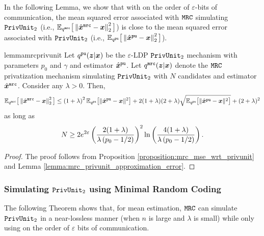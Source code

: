 In the following Lemma, we show that with on the order of $\varepsilon$-bits of communication, the mean squared error associated with $\texttt{MRC}$ simulating $\texttt{PrivUnit}_2$ (i.e., $\mathbb{E}_{q^{\texttt{mrc}}} \big[ \left\lVert  \hat{{\boldsymbol{x}}}^\texttt{mrc} - {\boldsymbol{x}} \right\rVert^2_2  \big]$) is close to the mean squared error associated with $\texttt{PrivUnit}_2$ (i.e., $\mathbb{E}_{q^{\texttt{pu}}} \big[ \left\lVert  \hat{{\boldsymbol{x}}}^\texttt{pu} - {\boldsymbol{x}} \right\rVert^2_2  \big]$).

\begin{restatable}{lemma}{mrcprivunit}\label{theorem:mrc_privunit}
Let $q^{\texttt{pu}}({\boldsymbol{z}} | {\boldsymbol{x}})$ be the  $\varepsilon$-LDP \emph{$\texttt{PrivUnit}_2$} mechanism with parameters $p_0$ and $\gamma$ and estimator $\hat{{\boldsymbol{x}}}^{\texttt{pu}}$. Let $q^{\texttt{mrc}}({\boldsymbol{z}}|{\boldsymbol{x}})$ denote the \emph{$\texttt{MRC}$} privatization mechanism simulating \emph{$\texttt{PrivUnit}_2$} with $N$ candidates and estimator $\hat{{\boldsymbol{x}}}^{\texttt{mrc}}$. 
Consider any $\lambda > 0$. Then,
\begin{align}
   \mathbb{E}_{q^{\texttt{mrc}}} \big[ \left\lVert  \hat{{\boldsymbol{x}}}^\texttt{mrc} - {\boldsymbol{x}} \right\rVert^2_2  \big] 
     \leq  \left( 1+\lambda \right)^2  \mathbb{E}_{q^{\texttt{pu}}}\big[\|\hat{{\boldsymbol{x}}}^{\texttt{pu}} -{\boldsymbol{x}}\|^2\big] + 2(1+\lambda)(2+\lambda) \sqrt{\mathbb{E}_{q^{\texttt{pu}}}\big[\|\hat{{\boldsymbol{x}}}^{\texttt{pu}} - {\boldsymbol{x}}\|^2\big]} + (2+\lambda)^2
\end{align}
as long as 
\begin{align}
    N \geq   2e^{2\varepsilon}\left(\frac{2 (1+\lambda)}{\lambda \left( p_0 -1/2 \right)}\right)^2 \ln\left( \frac{4(1+\lambda)}{\lambda \left( p_0 -1/2 \right)} \right).
\end{align}
\end{restatable}
\begin{proof}
The proof follows from Proposition \ref{proposition:mrc_mse_wrt_privunit} and Lemma \ref{lemma:mrc_privunit_approximation_error}.
\end{proof}

\subsubsection{Simulating \texorpdfstring{$\texttt{PrivUnit}_2$}{PrivUnit} using Minimal Random Coding }\label{appendix:mrc_pu_utility}
The following Theorem shows that, for mean estimation, $\texttt{MRC}$ can simulate $\texttt{PrivUnit}_2$ in a near-lossless manner (when $n$ is large and $\lambda$ is small) while only using on the order of $\varepsilon$ bits of communication.

